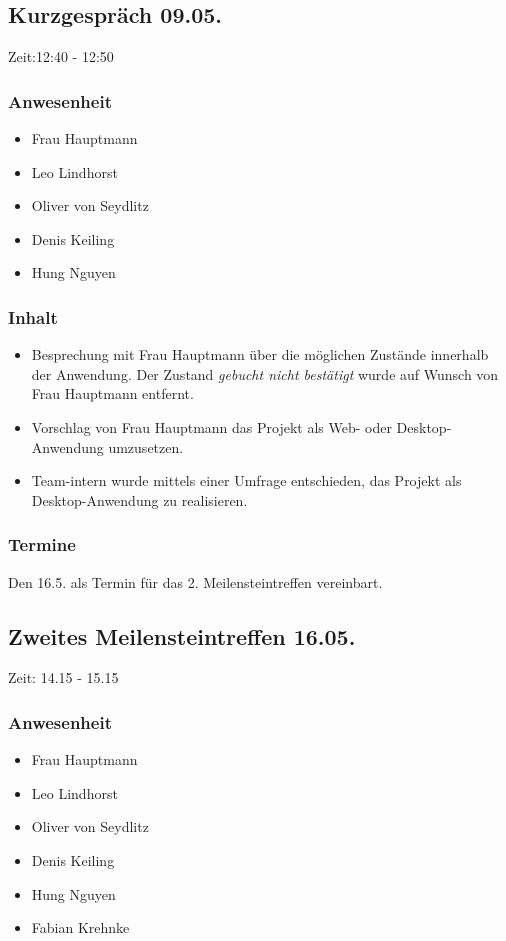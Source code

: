\subsection{Kurzgespräch 09.05.}

Zeit:12:40 - 12:50 

\subsubsection{Anwesenheit}
\begin{itemize}
	\item Frau Hauptmann
	\item Leo Lindhorst
	\item Oliver von Seydlitz
	\item Denis Keiling
	\item Hung Nguyen
\end{itemize}

\subsubsection{Inhalt}
\begin{itemize}
\item Besprechung mit Frau Hauptmann über die möglichen Zustände innerhalb der Anwendung. Der Zustand \textit{gebucht nicht bestätigt} wurde auf Wunsch von Frau Hauptmann entfernt. 
\item Vorschlag von Frau Hauptmann das Projekt als Web- oder Desktop-Anwendung umzusetzen.
\item Team-intern wurde mittels einer Umfrage entschieden, das Projekt als Desktop-Anwendung zu realisieren.
\end{itemize}

\subsubsection{Termine}
Den 16.5. als Termin für das 2. Meilensteintreffen vereinbart.



\subsection{Zweites Meilensteintreffen 16.05.}

Zeit: 14.15 - 15.15

\subsubsection{Anwesenheit}
\begin{itemize}
	\item Frau Hauptmann
	\item Leo Lindhorst
	\item Oliver von Seydlitz
	\item Denis Keiling
	\item Hung Nguyen
	\item Fabian Krehnke
\end{itemize}

